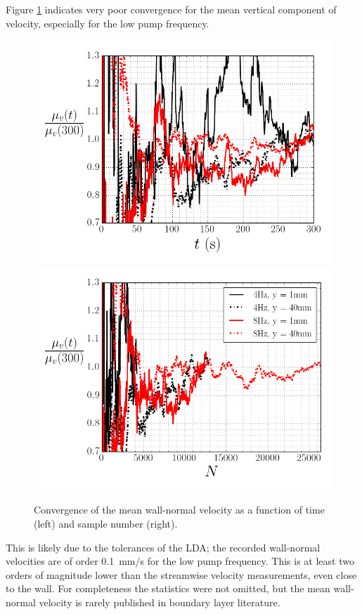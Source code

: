 \documentclass[12pt,oneside,a4paper]{article}
\begin{document}
Figure \ref{figure:experiments:timeDependence:meanUy} indicates very poor convergence for the mean vertical component of velocity, especially for the low pump frequency.
%
\begin{figure}[!b]
\centering
\includegraphics[width=0.5\linewidth]{images/LDA_timeDependenceImages/UyMeanTConvergence.png}\hfill
\includegraphics[width=0.5\linewidth]{images/LDA_timeDependenceImages/UyMeanNConvergence.png}\\
\caption{Convergence of the mean wall-normal velocity as a function of time (left) and sample number (right).}
\label{figure:experiments:timeDependence:meanUy}
\end{figure}
%
 This is likely due to the tolerances of the LDA; the recorded wall-normal velocities are of order  \SI{0.1}{mm/s} for the low pump frequency. This is at least two orders of magnitude lower than the streamwise velocity measurements, even close to the wall. For completeness the statistics were not omitted, but the mean wall-normal velocity is rarely published in boundary layer literature. 
\end{document}
